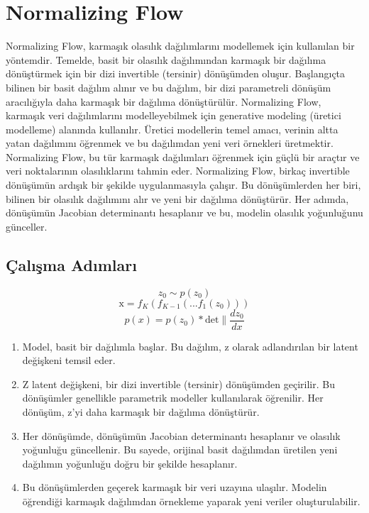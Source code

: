 \section{Normalizing Flow}

Normalizing Flow, karmaşık olasılık dağılımlarını modellemek için kullanılan bir yöntemdir. Temelde, basit bir olasılık dağılımından karmaşık bir dağılıma dönüştürmek için bir dizi invertible (tersinir) dönüşümden oluşur. Başlangıçta bilinen bir basit dağılım alınır ve bu dağılım, bir dizi parametreli dönüşüm aracılığıyla daha karmaşık bir dağılıma dönüştürülür. Normalizing Flow, karmaşık veri dağılımlarını modelleyebilmek için generative modeling (üretici modelleme) alanında kullanılır. Üretici modellerin temel amacı, verinin altta yatan dağılımını öğrenmek ve bu dağılımdan yeni veri örnekleri üretmektir. Normalizing Flow, bu tür karmaşık dağılımları öğrenmek için güçlü bir araçtır ve veri noktalarının olasılıklarını tahmin eder. Normalizing Flow, birkaç invertible dönüşümün ardışık bir şekilde uygulanmasıyla çalışır. Bu dönüşümlerden her biri, bilinen bir olasılık dağılımını alır ve yeni bir dağılıma dönüştürür. Her adımda, dönüşümün Jacobian determinantı hesaplanır ve bu, modelin olasılık yoğunluğunu günceller.

\subsection{Çalışma Adımları}

\[ z_0 \sim{p(z_0)} \]
\[ \text{x} = f_K(f_{K-1}(...f_1(z_0))) \]
\[ p(x) = p(z_0) * \text{det}\|\frac{dz_0}{dx} \]

\begin{enumerate}
    \item Model, basit bir dağılımla başlar. Bu dağılım, z olarak adlandırılan bir latent değişkeni temsil eder.
    \item Z latent değişkeni, bir dizi invertible (tersinir) dönüşümden geçirilir. Bu dönüşümler genellikle parametrik modeller kullanılarak öğrenilir. Her dönüşüm, z'yi daha karmaşık bir dağılıma dönüştürür.
    \item Her dönüşümde, dönüşümün Jacobian determinantı hesaplanır ve olasılık yoğunluğu güncellenir. Bu sayede, orijinal basit dağılımdan üretilen yeni dağılımın yoğunluğu doğru bir şekilde hesaplanır.
    \item Bu dönüşümlerden geçerek karmaşık bir veri uzayına ulaşılır. Modelin öğrendiği karmaşık dağılımdan örnekleme yaparak yeni veriler oluşturulabilir.
\end{enumerate}

\newpage